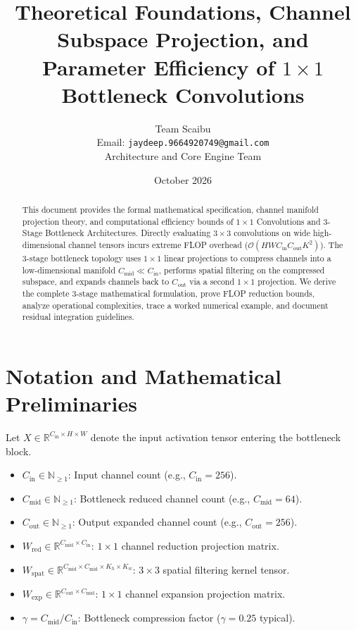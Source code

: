 \documentclass[11pt,a4paper]{article}
\title{\textbf{Theoretical Foundations, Channel Subspace Projection, and Parameter Efficiency of $1 \times 1$ Bottleneck Convolutions}}
\author{Team Scaibu \\ \small Email: \texttt{jaydeep.9664920749@gmail.com} \\ \small Architecture and Core Engine Team}
\date{October 2026}
\theoremstyle{definition}
\begin{document}
\maketitle

\begin{abstract}
This document provides the formal mathematical specification, channel manifold projection theory, and computational efficiency bounds of $1 \times 1$ Convolutions and 3-Stage Bottleneck Architectures. Directly evaluating $3 \times 3$ convolutions on wide high-dimensional channel tensors incurs extreme FLOP overhead ($\mathcal{O}(H W C_{\text{in}} C_{\text{out}} K^2)$). The 3-stage bottleneck topology uses $1 \times 1$ linear projections to compress channels into a low-dimensional manifold $C_{\text{mid}} \ll C_{\text{in}}$, performs spatial filtering on the compressed subspace, and expands channels back to $C_{\text{out}}$ via a second $1 \times 1$ projection. We derive the complete 3-stage mathematical formulation, prove FLOP reduction bounds, analyze operational complexities, trace a worked numerical example, and document residual integration guidelines.
\end{abstract}

\section{Notation and Mathematical Preliminaries}

Let $X \in \mathbb{R}^{C_{\text{in}} \times H \times W}$ denote the input activation tensor entering the bottleneck block.

\begin{itemize}
    \item $C_{\text{in}} \in \mathbb{N}_{\ge 1}$: Input channel count (e.g., $C_{\text{in}} = 256$).
    \item $C_{\text{mid}} \in \mathbb{N}_{\ge 1}$: Bottleneck reduced channel count (e.g., $C_{\text{mid}} = 64$).
    \item $C_{\text{out}} \in \mathbb{N}_{\ge 1}$: Output expanded channel count (e.g., $C_{\text{out}} = 256$).
    \item $W_{\text{red}} \in \mathbb{R}^{C_{\text{mid}} \times C_{\text{in}}}$: $1 \times 1$ channel reduction projection matrix.
    \item $W_{\text{spat}} \in \mathbb{R}^{C_{\text{mid}} \times C_{\text{mid}} \times K_h \times K_w}$: $3 \times 3$ spatial filtering kernel tensor.
    \item $W_{\text{exp}} \in \mathbb{R}^{C_{\text{out}} \times C_{\text{mid}}}$: $1 \times 1$ channel expansion projection matrix.
    \item $\gamma = C_{\text{mid}} / C_{\text{in}}$: Bottleneck compression factor ($\gamma = 0.25$ typical).
\end{itemize}
\end{document}
